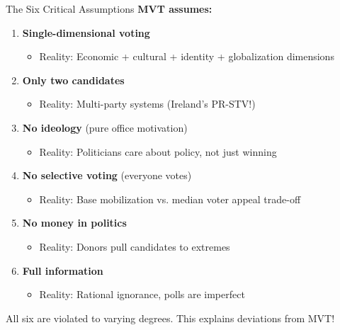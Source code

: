 \documentclass[10pt]{beamer}
\begin{document}
\begin{frame}{The Six Critical Assumptions}
\textbf{MVT assumes:}

\begin{enumerate}
\item \textbf{Single-dimensional voting}
\begin{itemize}
\item Reality: Economic + cultural + identity + globalization dimensions
\end{itemize}


\item \textbf{Only two candidates}
\begin{itemize}
\item Reality: Multi-party systems (Ireland's PR-STV!)
\end{itemize}


\item \textbf{No ideology} (pure office motivation)
\begin{itemize}
\item Reality: Politicians care about policy, not just winning
\end{itemize}


\item \textbf{No selective voting} (everyone votes)
\begin{itemize}
\item Reality: Base mobilization vs. median voter appeal trade-off
\end{itemize}


\item \textbf{No money in politics}
\begin{itemize}
\item Reality: Donors pull candidates to extremes
\end{itemize}


\item \textbf{Full information}
\begin{itemize}
\item Reality: Rational ignorance, polls are imperfect
\end{itemize}
\end{enumerate}



\alert{All six are violated to varying degrees. This explains deviations from MVT!}
\end{frame}
\end{document}
